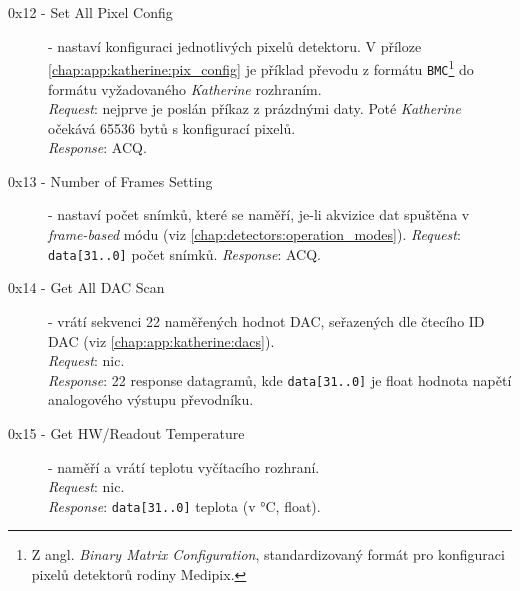 \begin{description}


    \item[0x12 - Set All Pixel Config] - nastaví konfiguraci jednotlivých pixelů detektoru. V příloze \ref{chap:app:katherine:pix_config} je příklad převodu z formátu \texttt{BMC}\footnote{Z angl. \textit{Binary Matrix Configuration}, standardizovaný formát pro konfiguraci pixelů detektorů rodiny Medipix.} do formátu vyžadovaného \textit{Katherine} rozhraním.
    \\\textit{Request}: nejprve je poslán příkaz z prázdnými daty. Poté \textit{Katherine} očekává 65536 bytů s konfigurací pixelů.
    \\\textit{Response}: ACQ.

    \item[0x13 - Number of Frames Setting] - nastaví počet snímků, které se naměří, je-li akvizice dat spuštěna v \textit{frame-based} módu (viz \ref{chap:detectors:operation_modes}).
    \textit{Request}: \texttt{data[31..0]} počet snímků.
    \textit{Response}: ACQ.

    \item[0x14 - Get All DAC Scan] - vrátí sekvenci 22 naměřených hodnot DAC, seřazených dle čtecího ID DAC (viz \ref{chap:app:katherine:dacs}).
    \\\textit{Request}: nic.
    \\\textit{Response}: 22 response datagramů, kde \texttt{data[31..0]} je float hodnota napětí analogového výstupu převodníku.

    \item[0x15 - Get HW/Readout Temperature] - naměří a vrátí teplotu vyčítacího rozhraní.
    \\\textit{Request}: nic.
    \\\textit{Response}: \texttt{data[31..0]} teplota (v °C, float).


\end{description}

